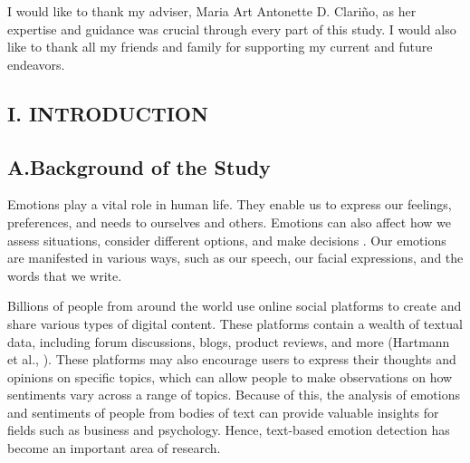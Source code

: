 \documentclass{icsthesis}
\begin{document}
\begin{frontmatter}
		\begin{acknowledgement}
			I would like to thank my adviser, Maria Art Antonette D. Clariño, as her expertise and guidance was crucial through every part of this study. I would also like to thank all my friends and family for supporting my current and future endeavors.
		\end{acknowledgement}
  
		\maketableofcontents

	\end{frontmatter}
	
	\begin{mainmatter}
         \doublespacing
		\section{I. INTRODUCTION}
			\subsection{A.\hspace{0.5cm}Background of the Study}
				Emotions play a vital role in human life. They enable us to express our feelings, preferences, and needs to ourselves and others. Emotions can also affect how we assess situations, consider different options, and make decisions \citep{Alzoubi1}. Our emotions are manifested in various ways, such as our speech, our facial expressions, and the words that we write.

                Billions of people from around the world use online social platforms to create and share various types of digital content. These platforms contain a wealth of textual data, including forum discussions, blogs, product reviews, and more (Hartmann et al., \citeyear{Hartmann1}). These platforms may also encourage users to express their thoughts and opinions on specific topics, which can allow people to make observations on how sentiments vary across a range of topics. Because of this, the analysis of emotions and sentiments of people from bodies of text can provide valuable insights for fields such as business and psychology. Hence, text-based emotion detection has become an important area of research.
                

\end{mainmatter}
\end{document}
